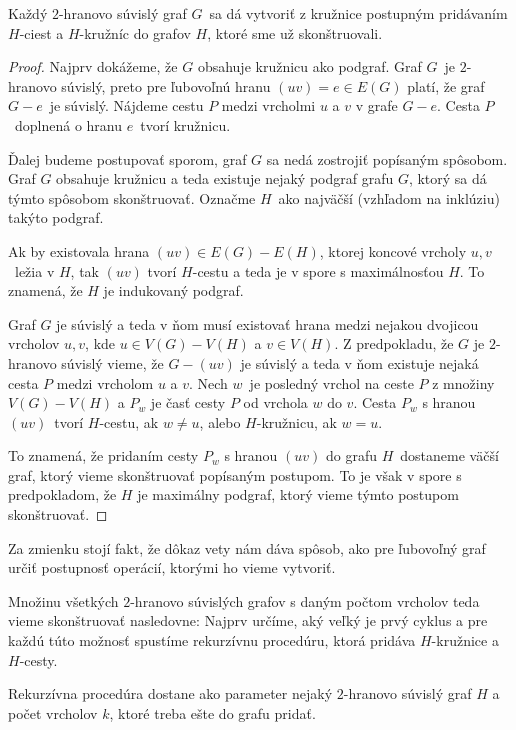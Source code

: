 \begin{veta}
    Každý $2$-hranovo súvislý graf $G$ sa dá vytvoriť z kružnice postupným pridávaním
    $H$-ciest a $H$-kružníc do grafov $H$, ktoré sme už skonštruovali.
\end{veta}
\begin{proof}
    Najprv dokážeme, že $G$ obsahuje kružnicu ako podgraf. Graf $G$ je $2$-hranovo súvislý,
    preto pre ľubovoľnú hranu $(uv) = e \in E(G)$ platí, že graf $G - e$ je súvislý. Nájdeme
    cestu $P$ medzi vrcholmi $u$ a $v$ v grafe $G - e$. Cesta $P$ doplnená o hranu $e$ tvorí
    kružnicu.

    Ďalej budeme postupovať sporom, graf $G$ sa nedá zostrojiť popísaným spôsobom. Graf $G$
    obsahuje kružnicu a teda existuje nejaký podgraf grafu $G$, ktorý sa dá týmto spôsobom
    skonštruovať. Označme $H$ ako najväčší (vzhľadom na inklúziu) takýto podgraf.

    Ak by existovala hrana $(uv) \in E(G) - E(H)$, ktorej koncové vrcholy $u, v$ ležia v
    $H$, tak $(uv)$ tvorí $H$-cestu a teda je v spore s maximálnosťou $H$. To znamená, že
    $H$ je indukovaný podgraf.
    
    Graf $G$ je súvislý a teda v ňom musí existovať hrana
    medzi nejakou dvojicou vrcholov $u, v$, kde $u \in V(G) - V(H)$ a $v \in V(H)$.
    Z predpokladu, že $G$ je $2$-hranovo súvislý vieme, že $G - (uv)$ je súvislý a teda
    v ňom existuje nejaká cesta $P$ medzi vrcholom $u$ a $v$. Nech $w$ je posledný vrchol
    na ceste $P$ z množiny $V(G) - V(H)$ a $P_w$ je časť cesty $P$ od vrchola $w$ do $v$.
    Cesta $P_w$ s hranou $(uv)$ tvorí $H$-cestu, ak $w \neq u$, alebo $H$-kružnicu, ak $w = u$.

    To znamená, že pridaním cesty $P_w$ s hranou $(uv)$ do grafu $H$ dostaneme väčší graf,
    ktorý vieme skonštruovať popísaným postupom. To je však v spore s predpokladom, že $H$ je
    maximálny podgraf, ktorý vieme týmto postupom skonštruovať.
\end{proof}

Za zmienku stojí fakt, že dôkaz vety nám dáva spôsob, ako pre ľubovoľný graf určiť
postupnosť operácií, ktorými ho vieme vytvoriť.

Množinu všetkých $2$-hranovo súvislých grafov s daným počtom vrcholov teda vieme skonštruovať
nasledovne: Najprv určíme, aký veľký je prvý cyklus a pre každú túto možnosť spustíme
rekurzívnu procedúru, ktorá pridáva $H$-kružnice a $H$-cesty.

Rekurzívna procedúra dostane ako parameter nejaký $2$-hranovo súvislý graf $H$ a počet
vrcholov $k$, ktoré treba ešte do grafu pridať.

